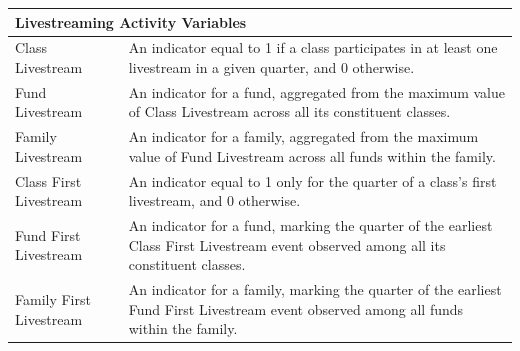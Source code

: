 \begin{longtable}{lp{}}
    \multicolumn{2}{l}{\textbf{Livestreaming Activity Variables}}                                                                                                                                                                                                                                                                                    \\
    \midrule
    Class Livestream               & An indicator equal to 1 if a class participates in at least one livestream in a given quarter, and 0 otherwise.                                                                                                                                                                                                   \\
    \midrule
    Fund Livestream                & An indicator for a fund, aggregated from the maximum value of Class Livestream across all its constituent classes.                                                                                                                                                                                                \\
    \midrule
    Family Livestream              & An indicator for a family, aggregated from the maximum value of Fund Livestream across all funds within the family.                                                                                                                                                                                               \\
    \midrule
    Class First Livestream         & An indicator equal to 1 only for the quarter of a class's first livestream, and 0 otherwise.                                                                                                                                                                                                                      \\
    \midrule
    Fund First Livestream          & An indicator for a fund, marking the quarter of the earliest Class First Livestream event observed among all its constituent classes.                                                                                                                                                                             \\
    \midrule
    Family First Livestream        & An indicator for a family, marking the quarter of the earliest Fund First Livestream event observed among all funds within the family.                                                                                                                                                                            \\

\end{longtable}
